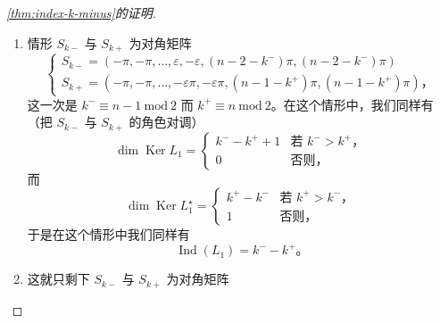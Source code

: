 \begin{proof}[\cref{thm:index-k-minus}的证明]
\begin{enumerate}[label=(\arabic*)]
\[\begin{array}{l}
\end{array}\right.
\]
其中 $k^{-}\equiv n\ \mathrm{mod}\ 2$ 而 $k^{+}\equiv n-1\ \mathrm{mod}\ 2$。在这个情形中，我们取 $a_1(s)=a_2(s)$，但第 $(n-1)$ 个分块除外，对这个分块我们可以假设 $\sup_{s\in\RR}\|S(s)\|<1$。我们得到
\[
\begin{aligned}
\dim\operatorname{Ker}L_1
&=2\,\#\bigl\{\ell\in\ZZ\mid n-1-k^{-}<2\ell<n-2-k^{+}\bigr\}+1\\
&=\left\{\begin{array}{ll}
(k^{-}-k^{+}-1)+1 & \text{若 }k^{-}>k^{+}\text{，}\\
1 & \text{若 }k^{-}<k^{+}\text{，}
\end{array}\right.
\end{aligned}
\]
而
\[
\begin{aligned}
\dim\operatorname{Ker}L_1^{\star}
&=2\,\#\bigl\{\ell\in\ZZ\mid k^{-}-n+1<2\ell<k^{+}-n+2\bigr\}\\
&=\left\{\begin{array}{ll}
k^{+}-k^{-}+1 & \text{若 }k^{+}>k^{-}\text{，}\\
0 & \text{否则。}
\end{array}\right.
\end{aligned}
\]
因此，在这个情形中我们同样有
\[
\operatorname{Ind}(L_1)=k^{-}-k^{+}\text{。}
\]
\item 情形 $S_{k-}$ 与 $S_{k+}$ 为对角矩阵
\[
\left\{\begin{array}{l}
S_{k-}=(-\pi,-\pi,\dotsc,\varepsilon,-\varepsilon,(n-2-k^{-})\pi,(n-2-k^{-})\pi)\\
S_{k+}=(-\pi,-\pi,\dotsc,-\varepsilon\pi,-\varepsilon\pi,(n-1-k^{+})\pi,(n-1-k^{+})\pi)\text{，}
\end{array}\right.
\]
这一次是 $k^{-}\equiv n-1\ \mathrm{mod}\ 2$ 而 $k^{+}\equiv n\ \mathrm{mod}\ 2$。在这个情形中，我们同样有（把 $S_{k-}$ 与 $S_{k+}$ 的角色对调）
\[
\dim\operatorname{Ker}L_1=\left\{\begin{array}{ll}
k^{-}-k^{+}+1 & \text{若 }k^{-}>k^{+}\text{，}\\
0 & \text{否则，}
\end{array}\right.
\]
而
\[
\dim\operatorname{Ker}L_1^{\star}=\left\{\begin{array}{ll}
k^{+}-k^{-} & \text{若 }k^{+}>k^{-}\text{，}\\
1 & \text{否则，}
\end{array}\right.
\]
于是在这个情形中我们同样有
\[
\operatorname{Ind}(L_1)=k^{-}-k^{+}\text{。}
\]
\item 这就只剩下 $S_{k-}$ 与 $S_{k+}$ 为对角矩阵

\end{enumerate}
\end{proof}
